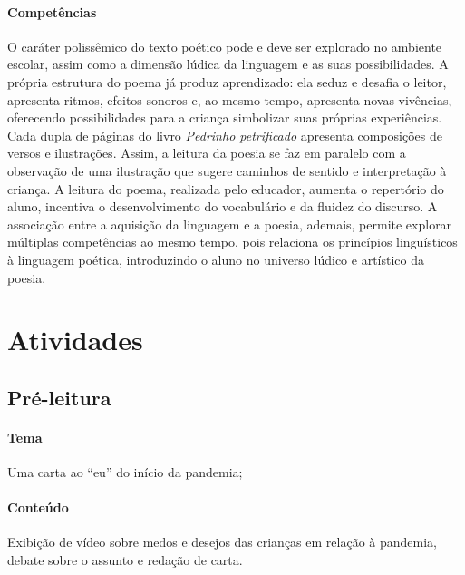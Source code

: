 \documentclass[11pt]{extarticle}
\begin{document}
\paragraph{Competências} O caráter polissêmico do texto poético pode e deve ser explorado no ambiente escolar, assim como a dimensão lúdica da linguagem e as suas possibilidades. A própria estrutura do poema já produz aprendizado: ela seduz e desafia o leitor, apresenta ritmos, efeitos sonoros e, ao mesmo tempo, apresenta novas vivências, oferecendo possibilidades para a criança simbolizar suas próprias experiências. Cada dupla de páginas do livro \textit{Pedrinho petrificado} apresenta composições de versos e ilustrações. Assim, a leitura da poesia se faz em paralelo com a observação de uma ilustração que sugere caminhos de sentido e interpretação à criança. A leitura do poema, realizada pelo educador, aumenta o repertório do aluno, incentiva o desenvolvimento do vocabulário e da fluidez do discurso. A associação entre a aquisição da linguagem e a poesia, ademais, permite explorar múltiplas competências ao mesmo tempo, pois relaciona os princípios linguísticos à linguagem poética, introduzindo o aluno no universo lúdico e artístico da poesia.

\section{Atividades}

\subsection{Pré-leitura}


\paragraph{Tema} Uma carta ao ``eu'' do início da pandemia;

\paragraph{Conteúdo} Exibição de vídeo sobre medos e desejos das crianças em relação à pandemia, debate sobre o assunto e redação de carta.
\end{document}
